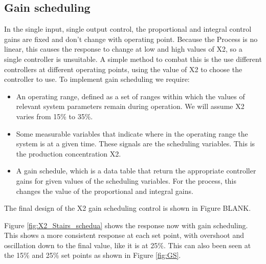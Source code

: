 \documentclass[11pt]{article}
\begin{document}
\subsection{Gain scheduling}
In the single input, single output control, the proportional and integral control gains are fixed and don't change with operating point. Because the Process is no linear, this causes the response to change at low and high values of X2, so a single controller is unsuitable. A simple method to combat this is the use different controllers at different operating points, using the value of X2 to choose the controller to use. To implement gain scheduling we require:

\begin{itemize}

    \item An operating range, defined as a set of ranges within which the values of relevant system parameters remain during operation. We will assume X2 varies from 15\% to 35\%.

    \item Some measurable variables that indicate where in the operating range the system is at a given time. These signals are the scheduling variables. This is the production concentration X2.

    \item A gain schedule, which is a  data table that return the appropriate controller gains for given values of the scheduling variables. For the process, this changes the value of the proportional and integral gains.

\end{itemize}

The final design of the X2 gain scheduling control is shown in Figure BLANK.

Figure \ref{fig:X2_Stairs_schedua} shows the response now with gain scheduling. This shows a more consistent response at each set point, with overshoot and oscillation down to the final value, like it is at 25\%. This can also been seen at the 15\% and 25\% set points as shown in Figure \ref{fig:GS}.
\end{document}
